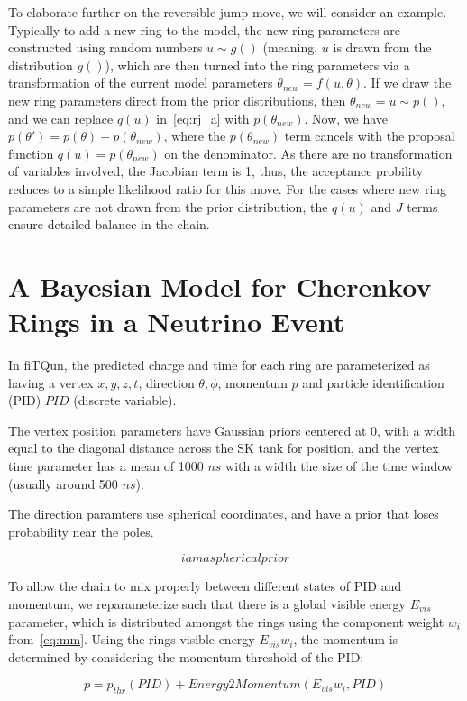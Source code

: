 \documentclass[11pt]{article} %
\begin{document}
To elaborate further on the reversible jump move, we will consider an example. Typically to add a new ring to the model, the new ring parameters are constructed using random numbers $u\sim g()$ (meaning, $u$ is drawn from the distribution $g()$), which are then turned into the ring parameters via a transformation of the current model parameters $\theta_{new} = f(u,\theta)$. If we draw the new ring parameters direct from the prior distributions, then $\theta_{new} = u\sim p()$, and we can replace $q(u)$ in~\ref{eq:rj_a} with $p(\theta_{new})$. Now, we have $p(\theta')=p(\theta)+p(\theta_{new})$, where the $p(\theta_{new})$ term cancels with the proposal function $q(u) = p(\theta_{new})$ on the denominator. As there are no transformation of variables involved, the Jacobian term is 1, thus, the acceptance probility reduces to a simple likelihood ratio for this move. For the cases where new ring parameters are not drawn from the prior distribution, the $q(u)$ and $J$ terms ensure detailed balance in the chain.

\section{A Bayesian Model for Cherenkov Rings in a Neutrino Event}
In fiTQun, the predicted charge and time for each ring are parameterized as having a vertex $x,y,z,t$, direction $\theta,\phi$, momentum $p$ and particle identification (PID) $PID$ (discrete variable).

The vertex position parameters have Gaussian priors centered at 0, with a width equal to the diagonal distance across the SK tank for position, and the vertex time parameter has a mean of 1000 $ns$ with a width the size of the time window (usually around 500 $ns$).

The direction paramters use spherical coordinates, and have a prior that loses probability near the poles.

\begin{equation}
i am a spherical prior
\end{equation}

To allow the chain to mix properly between different states of PID and momentum, we reparameterize such that there is a global visible energy $E_{vis}$ parameter, which is distributed amongst the rings using the component weight $w_{i}$ from~\ref{eq:mm}. Using the rings visible energy $E_{vis}w_{i}$, the momentum is determined by considering the momentum threshold of the PID:

\begin{equation}
p = p_{thr}(PID) + Energy2Momentum(E_{vis}w_{i}, PID)
\end{equation}
\end{document}
